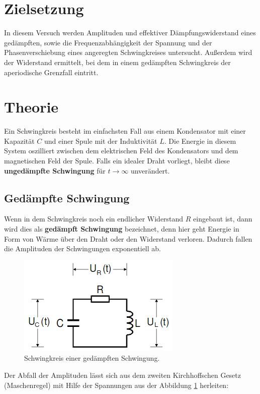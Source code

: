\section{Zielsetzung}
In diesem Versuch werden Amplituden und effektiver Dämpfungswiderstand eines gedämpften, sowie
die Frequenzabhängigkeit der Spannung und der Phasenverschiebung eines angeregten Schwingkreises
untersucht. Außerdem wird der Widerstand ermittelt, bei dem in einem gedämpften Schwingkreis der
aperiodische Grenzfall eintritt.

\section{Theorie}
Ein Schwingkreis besteht im einfachsten Fall aus einem Kondensator mit einer Kapazität $C$ und einer Spule mit der Induktivität $L$.
Die Energie in diesem System oszilliert zwischen dem elektrischen Feld des Kondensators und dem magnetischen Feld der Spule.
Falls ein idealer Draht vorliegt, bleibt diese \textbf{ungedämpfte Schwingung} für $ t \to \infty $ unverändert.

\subsection{Gedämpfte Schwingung}

Wenn  in dem Schwingkreis noch ein endlicher Widerstand $R$ eingebaut ist, dann wird dies als \textbf{gedämpft Schwingung}
bezeichnet, denn hier geht Energie in Form von Wärme über den Draht oder den Widerstand verloren. Dadurch fallen die Amplituden
der Schwingungen exponentiell ab.

\begin{figure}[h]
  \centering
  \includegraphics[scale=0.5]{gSchwingkreis.png}
  \caption{Schwingkreis einer gedämpften Schwingung.}
  \label{gSchwingung}
\end{figure}

Der Abfall der Amplituden lässt sich aus dem zweiten Kirchhoffschen Gesetz (Maschenregel) mit Hilfe der Spannungen aus der Abbildung \ref{gSchwingung}
herleiten:

